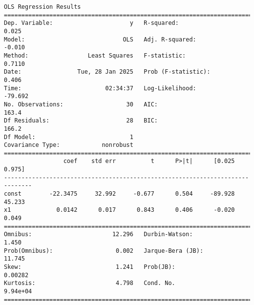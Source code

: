 \documentclass[11pt]{article}
\begin{document}
    \begin{Verbatim}[commandchars=\\\{\}]
                            OLS Regression Results
==============================================================================
Dep. Variable:                      y   R-squared:                       0.025
Model:                            OLS   Adj. R-squared:                 -0.010
Method:                 Least Squares   F-statistic:                    0.7110
Date:                Tue, 28 Jan 2025   Prob (F-statistic):              0.406
Time:                        02:34:37   Log-Likelihood:                -79.692
No. Observations:                  30   AIC:                             163.4
Df Residuals:                      28   BIC:                             166.2
Df Model:                           1
Covariance Type:            nonrobust
==============================================================================
                 coef    std err          t      P>|t|      [0.025      0.975]
------------------------------------------------------------------------------
const        -22.3475     32.992     -0.677      0.504     -89.928      45.233
x1             0.0142      0.017      0.843      0.406      -0.020       0.049
==============================================================================
Omnibus:                       12.296   Durbin-Watson:                   1.450
Prob(Omnibus):                  0.002   Jarque-Bera (JB):               11.745
Skew:                           1.241   Prob(JB):                      0.00282
Kurtosis:                       4.798   Cond. No.                     9.94e+04
==============================================================================


\end{Verbatim}
\end{document}
